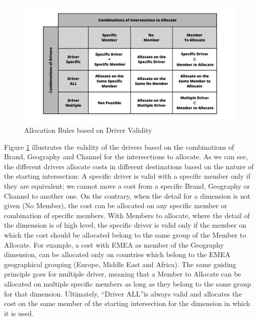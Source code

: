 \documentclass[12pt,a4paper,openright,twoside]{book}
\begin{document}
\begin{figure}[htbp]
	\centering
	\includegraphics[width=\linewidth]{figures/driver-table.pdf}
	\caption{Allocation Rules based on Driver Validity}
	\label{fig:driver}
\end{figure}

Figure \ref{fig:driver} illustrates the validity of the drivers based on the combinations of Brand, Geography and Channel for the intersections to allocate.
%
As we can see, the different drivers allocate costs in different destinations based on the nature of the  starting intersection:
%
A specific driver is valid with a specific member only if they are equivalent; we cannot move a cost from a specific Brand, Geography or Channel to another one.
%
On the contrary, when the detail for a dimension is not given (No Member), the cost can be allocated on any specific member or combination of specific members.
%
With Members to allocate, where the detail of the dimension is of high level, the specific driver is valid only if the member on which the cost should be allocated belong to the same group of the Member to Allocate.
%
For example, a cost with EMEA as member of the Geography dimension, can be allocated only on countries which belong to the EMEA geographical grouping (Europe, Middle East and Africa).
%
The same guiding principle goes for multiple driver, meaning that a Member to Allocate can be allocated on multiple specific members as long as they belong to the same group for that dimension.
%
Ultimately, ``Driver ALL''is always valid and allocates the cost on the same member of the starting intersection for the dimension in which it is used.
\end{document}

